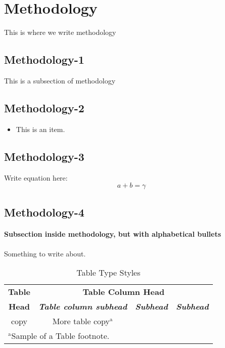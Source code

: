 \documentclass[conference]{IEEEtran}
\begin{document}
\section{Methodology}
This is where we write methodology

\subsection{Methodology-1}\label{AA}
This is a subsection of methodology 

\subsection{Methodology-2}
\begin{itemize}
\item This is an item.
\end{itemize}

\subsection{Methodology-3}
Write equation here:
\begin{equation}
a+b=\gamma\label{eq}
\end{equation}

\subsection{Methodology-4}
\paragraph{Subsection inside methodology, but with alphabetical bullets} Something to write about.
\begin{table}[htbp]
\caption{Table Type Styles}
\begin{center}
\begin{tabular}{|c|c|c|c|}
\hline
\textbf{Table}&\multicolumn{3}{|c|}{\textbf{Table Column Head}} \\
\cline{2-4} 
\textbf{Head} & \textbf{\textit{Table column subhead}}& \textbf{\textit{Subhead}}& \textbf{\textit{Subhead}} \\
\hline
copy& More table copy$^{\mathrm{a}}$& &  \\
\hline
\multicolumn{4}{l}{$^{\mathrm{a}}$Sample of a Table footnote.}
\end{tabular}
\label{tab1}
\end{center}
\end{table}
\end{document}
